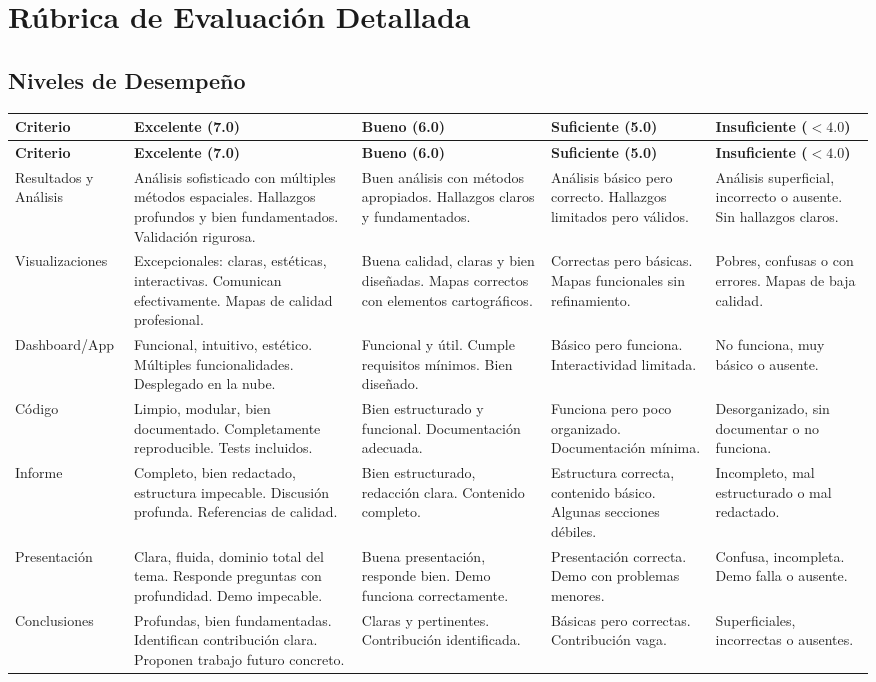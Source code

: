 \documentclass[11pt,a4paper]{article}
\begin{document}
\section{Rúbrica de Evaluación Detallada}
\subsection{Niveles de Desempeño}
\begin{longtable}{p{} p{} p{} p{} p{}}
\toprule
\textbf{Criterio} & \textbf{Excelente (7.0)} & \textbf{Bueno (6.0)} & \textbf{Suficiente (5.0)} & \textbf{Insuficiente ($<4.0$)}\\
\midrule
\endfirsthead
\toprule
\textbf{Criterio} & \textbf{Excelente (7.0)} & \textbf{Bueno (6.0)} & \textbf{Suficiente (5.0)} & \textbf{Insuficiente ($<4.0$)}\\
\midrule
\endhead
Resultados y Análisis &
Análisis sofisticado con múltiples métodos espaciales. Hallazgos profundos y bien fundamentados. Validación rigurosa. &
Buen análisis con métodos apropiados. Hallazgos claros y fundamentados. &
Análisis básico pero correcto. Hallazgos limitados pero válidos. &
Análisis superficial, incorrecto o ausente. Sin hallazgos claros.\\
\midrule
Visualizaciones &
Excepcionales: claras, estéticas, interactivas. Comunican efectivamente. Mapas de calidad profesional. &
Buena calidad, claras y bien diseñadas. Mapas correctos con elementos cartográficos. &
Correctas pero básicas. Mapas funcionales sin refinamiento. &
Pobres, confusas o con errores. Mapas de baja calidad.\\
\midrule
Dashboard/App &
Funcional, intuitivo, estético. Múltiples funcionalidades. Desplegado en la nube. &
Funcional y útil. Cumple requisitos mínimos. Bien diseñado. &
Básico pero funciona. Interactividad limitada. &
No funciona, muy básico o ausente.\\
\midrule
Código &
Limpio, modular, bien documentado. Completamente reproducible. Tests incluidos. &
Bien estructurado y funcional. Documentación adecuada. &
Funciona pero poco organizado. Documentación mínima. &
Desorganizado, sin documentar o no funciona.\\
\midrule
Informe &
Completo, bien redactado, estructura impecable. Discusión profunda. Referencias de calidad. &
Bien estructurado, redacción clara. Contenido completo. &
Estructura correcta, contenido básico. Algunas secciones débiles. &
Incompleto, mal estructurado o mal redactado.\\
\midrule
Presentación &
Clara, fluida, dominio total del tema. Responde preguntas con profundidad. Demo impecable. &
Buena presentación, responde bien. Demo funciona correctamente. &
Presentación correcta. Demo con problemas menores. &
Confusa, incompleta. Demo falla o ausente.\\
\midrule
Conclusiones &
Profundas, bien fundamentadas. Identifican contribución clara. Proponen trabajo futuro concreto. &
Claras y pertinentes. Contribución identificada. &
Básicas pero correctas. Contribución vaga. &
Superficiales, incorrectas o ausentes.\\
\bottomrule
\end{longtable}
\end{document}
